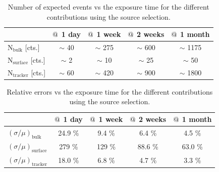\documentclass[main.tex]{subfiles}
\begin{document}
\begin{table}[h!]
\begin{center}
\begin{tabular}{l|c|c|c|c}
 & $\symbol{64}$ 1 day  & $\symbol{64}$ 1 week  & $\symbol{64}$ 2 weeks & $\symbol{64}$ 1 month  \\
\hline
$\text{N}_\text{bulk}$ [cts.]    & $\sim$ 40 & $\sim$ 275  & $\sim$ 600 & $\sim$ 1175 \\
$\text{N}_\text{surface}$ [cts.] & $\sim$ 2  & $\sim$ 10   & $\sim$ 25  & $\sim$ 50   \\
$\text{N}_\text{tracker}$ [cts.] & $\sim$ 60 & $\sim$ 420  & $\sim$ 900 & $\sim$ 1800 \\
\hline
\end{tabular}
\end{center}
\caption{Number of expected events vs the exposure time for the different contributions using the source selection.}
\label{table_number_of_expected_events_source_selection}
\end{table}


\begin{table}[h!]
\begin{center}
\begin{tabular}{l|c|c|c|c}
      & $\symbol{64}$ 1 day  & $\symbol{64}$ 1 week  & $\symbol{64}$ 2 weeks & $\symbol{64}$ 1 month  \\
\hline
$(\sigma / \mu)_{\text{bulk}}$    & 24.9 \% & 9.4  \% & 6.4  \% & 4.5  \% \\
$(\sigma / \mu)_{\text{surface}}$ & 279  \% & 129  \% & 88.6 \% & 63.0 \% \\
$(\sigma / \mu)_{\text{tracker}}$ & 18.0 \% & 6.8  \% & 4.7  \% & 3.3  \% \\
\hline
\end{tabular}
\end{center}
\caption{Relative errors vs the exposure time for the different contributions using the source selection.}
\label{table_relative_error_source_selection}
\end{table}
\end{document}
